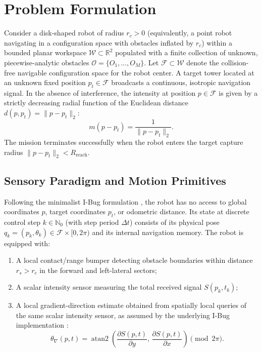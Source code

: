 \documentclass[12pt, a4paper]{article}
\begin{document}
\section{Problem Formulation}
\label{sec:formulation}
Consider a disk-shaped robot of radius $r_c > 0$ (equivalently, a point robot navigating in a configuration space with obstacles inflated by $r_c$) within a bounded planar workspace $\mathcal{W} \subset \mathbb{R}^2$ populated with a finite collection of unknown, piecewise-analytic obstacles $\mathcal{O} = \{O_1, \dots, O_M\}$. Let $\mathcal{F} \subset \mathcal{W}$ denote the collision-free navigable configuration space for the robot center. A target tower located at an unknown fixed position $p_t \in \mathcal{F}$ broadcasts a continuous, isotropic navigation signal. In the absence of interference, the intensity at position $p \in \mathcal{F}$ is given by a strictly decreasing radial function of the Euclidean distance $d(p, p_t) = \|p - p_t\|_2$:
\begin{equation}
    m(p - p_t) = \frac{1}{\|p - p_t\|_2}.
    \label{eq:target_field}
\end{equation}
The mission terminates successfully when the robot enters the target capture radius $\|p - p_t\|_2 < R_{\text{reach}}$.

\subsection{Sensory Paradigm and Motion Primitives}
Following the minimalist I-Bug formulation \cite{taylor2014intensity}, the robot has no access to global coordinates $p$, target coordinates $p_t$, or odometric distance. Its state at discrete control step $k \in \mathbb{N}_0$ (with step period $\Delta t$) consists of its physical pose $q_k = (p_k, \theta_k) \in \mathcal{F} \times [0, 2\pi)$ and its internal navigation memory. The robot is equipped with:
\begin{enumerate}
    \item A local contact/range bumper detecting obstacle boundaries within distance $r_s > r_c$ in the forward and left-lateral sectors;
    \item A scalar intensity sensor measuring the total received signal $S(p_k, t_k)$;
    \item A local gradient-direction estimate obtained from spatially local queries of the same scalar intensity sensor, as assumed by the underlying I-Bug implementation \cite{taylor2014intensity}:
    \begin{equation}
        \theta_{\nabla}(p, t) = \operatorname{atan2}\!\left(\frac{\partial S(p, t)}{\partial y},\, \frac{\partial S(p, t)}{\partial x}\right) \pmod{2\pi}.
        \label{eq:gradient_angle}
    \end{equation}
\end{enumerate}
\end{document}
